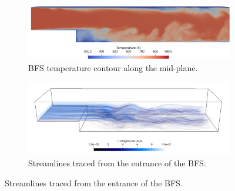\begin{figure}

\end{figure}
\begin{figure}
  \begin{subfigure}{1\textwidth}
  \includegraphics[width=\linewidth]{figures/ch4/BFS_temperature.png}
  \caption{BFS temperature contour along the mid-plane. }
  \label{fig:BFS_temperature}
  \end{subfigure}
  \begin{subfigure}{1\textwidth}
  \includegraphics[width=\linewidth]{figures/ch4/BFS_streamlines6.png}
  \caption{Streamlines traced from the entrance of the BFS.}
  \label{fig:BFS_streamlines}
  \end{subfigure}
  \label{fig:BFS_contours}
\end{figure}

